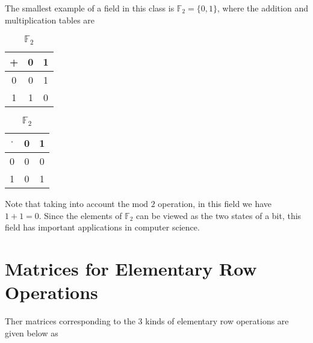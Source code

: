 \documentclass[a4paper,12pt]{report}
\begin{document}
\begin{appendices}
The smallest example of a field in this class is \(\mathbb{F} _{2}  = \{0,1\} \), where the addition and multiplication tables are


\begin{table}[H]
    \begin{minipage}[t]{0.5\linewidth}
    \centering
    \begin{tabular}{c|c|c}
        \toprule
          +   &  0  &  1 \\
        \midrule
          0   &  0  &  1 \\
          1   &  1  &  0 \\
        \bottomrule
    \end{tabular}
    \caption{ \(\mathbb{F}_{2}  \) }
\label{add}
\end{minipage} 
\begin{minipage}[t]{0.5\linewidth}
    \centering
    \begin{tabular}{c|c|c}
        \toprule
          \(\cdot \)    & 0 & 1  \\
        \midrule
            0 & 0 &  0 \\
            1 & 0 &  1 \\
        \bottomrule
    \end{tabular}
    \caption{ \(\mathbb{F}_{2}  \)  }
\label{mul}
\end{minipage}
\end{table}

Note that taking into account the \(\text{mod } 2 \) operation, in this field we have \(1+1 = 0\). Since the elements of \(\mathbb{F}_{2}  \) can be viewed as the two states of a bit, this field has important applications in computer science. 

\section{Matrices for Elementary Row Operations} \label{APA} 

Ther matrices corresponding to the 3 kinds of elementary row operations are given below as


\end{appendices}
\end{document}
